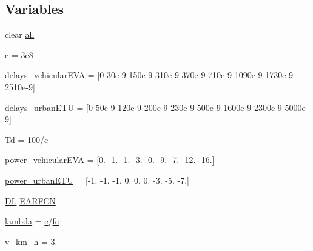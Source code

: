 \subsection*{Variables}
\begin{DoxyCompactItemize}
\item 
clear \hyperlink{lte_2model_2fading-traces_2fading__trace__generator_8m_a00a349297fa58bc80ff5329e25dcfe28}{all}
\item 
\hyperlink{lte_2model_2fading-traces_2fading__trace__generator_8m_ae0323a9039add2978bf5b49550572c7c}{c} = 3e8
\item 
\hyperlink{lte_2model_2fading-traces_2fading__trace__generator_8m_ab3d827b00d38729fe570d339e33d1f73}{delays\+\_\+vehicular\+E\+VA} = \mbox{[}0 30e-\/9 150e-\/9 310e-\/9 370e-\/9 710e-\/9 1090e-\/9 1730e-\/9 2510e-\/9\mbox{]}
\item 
\hyperlink{lte_2model_2fading-traces_2fading__trace__generator_8m_a2430f6739a38fc80fedbfa62769d2964}{delays\+\_\+urban\+E\+TU} = \mbox{[}0 50e-\/9 120e-\/9 200e-\/9 230e-\/9 500e-\/9 1600e-\/9 2300e-\/9 5000e-\/9\mbox{]}
\item 
\hyperlink{lte_2model_2fading-traces_2fading__trace__generator_8m_aea74bce2def3167f74eb7bbfc6796882}{Td} = 100/\hyperlink{mmwave_2model_2fading-traces_2fading__trace__generator_8m_ae0323a9039add2978bf5b49550572c7c}{c}
\item 
\hyperlink{lte_2model_2fading-traces_2fading__trace__generator_8m_a60909e41d7ca79f02db1849716d719b4}{power\+\_\+vehicular\+E\+VA} = \mbox{[}0. -\/1. -\/1. -\/3. -\/0. -\/9. -\/7. -\/12. -\/16.\mbox{]}
\item 
\hyperlink{lte_2model_2fading-traces_2fading__trace__generator_8m_a7ba5c705943c4503a79e8758121bff38}{power\+\_\+urban\+E\+TU} = \mbox{[}-\/1. -\/1. -\/1. 0. 0. 0. -\/3. -\/5. -\/7.\mbox{]}
\item 
\hyperlink{lte__uplink__power__control_8m_acbfa302723d9ea416f536a1ead7a5026}{DL} \hyperlink{lte_2model_2fading-traces_2fading__trace__generator_8m_aaf9d1de236e0d66a6386c33f6e66f766}{E\+A\+R\+F\+CN}
\item 
\hyperlink{lte_2model_2fading-traces_2fading__trace__generator_8m_aca36b09d6e71a60cfa3837d7e24c07ca}{lambda} = \hyperlink{mmwave_2model_2fading-traces_2fading__trace__generator_8m_ae0323a9039add2978bf5b49550572c7c}{c}/\hyperlink{lte__uplink__power__control_8m_a72d54db2b27ce046aab6e6a414c407e9}{fc}
\item 
\hyperlink{lte_2model_2fading-traces_2fading__trace__generator_8m_ae7f804d3a4530aaf512fd8c59271cfd2}{v\+\_\+km\+\_\+h} = 3.

\end{DoxyCompactItemize}
